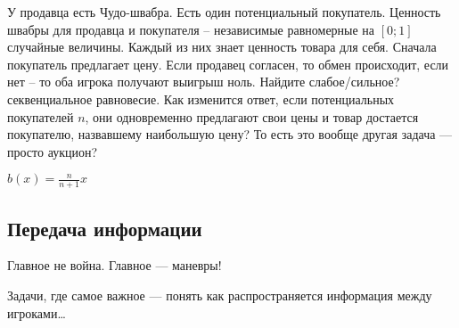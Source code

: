 \begin{problem}
У продавца есть Чудо-швабра. Есть один потенциальный покупатель. Ценность швабры для продавца и покупателя -- независимые равномерные на $[0;1]$ случайные величины. Каждый из них знает ценность товара для себя. Сначала покупатель предлагает цену. Если продавец согласен, то обмен происходит, если нет -- то оба игрока получают выигрыш ноль. Найдите {\red слабое/сильное? секвенциальное}  равновесие. Как изменится ответ, если потенциальных покупателей $n$, они одновременно предлагают свои цены и товар достается покупателю, назвавшему наибольшую цену? {\red То есть это вообще другая задача --- просто аукцион?}



\begin{sol}
$b(x)=\frac{n}{n+1}x$
\end{sol}
\end{problem}




\subsection{Передача информации}

Главное не война. Главное --- маневры!

Задачи, где самое важное ---  понять как распространяется информация между игроками\ldots

